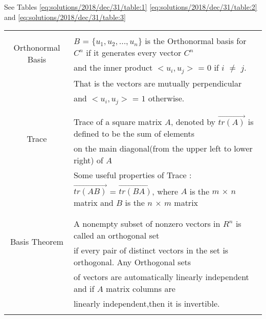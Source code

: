 See Tables     \ref{eq:solutions/2018/dec/31/table:1}
    \ref{eq:solutions/2018/dec/31/table:2} and 
    \ref{eq:solutions/2018/dec/31/table:3}

\begin{table*}[ht!]
\centering
\begin{tabular}{|c|l|}
    \hline
	\multirow{3}{*}{Orthonormal Basis} 
	& \\
	& $B$ = $\{u_1,u_2,...,u_n\}$ is the Orthonormal basis for $C^n$ if it generates every vector $C^n$\\
	& and the inner product $<u_i,u_j>$ = $0$ if $i$ $\ne$ $j$.\\
	& That is the vectors are mutually perpendicular\\
	& and $<u_i,u_j>$ = $1$ otherwise. \\
	&\\
	\hline
	\multirow{3}{*}{Trace} 
	&\\
	& Trace of a square matrix $A$, denoted by $\Vec{tr(A)}$ is defined to be the sum of elements\\
	& on the main diagonal(from the upper left to lower right) of $A$\\
	& Some useful properties of Trace : \\
	&  $\Vec{tr(AB)}$ =  $\Vec{tr(BA)}$, where $A$ is the $m$ $\times$ $n$ matrix and $B$ is the $n$ $\times$ $m$ matrix\\  
	&\\
	\hline
	\multirow{3}{*}{Basis Theorem} 
	&\\
	& A nonempty subset of nonzero vectors in $R^n$ is called an orthogonal set\\
	& if every pair of distinct vectors in the set is orthogonal. Any Orthogonal sets\\
	&  of vectors are automatically linearly independent and if $A$ matrix columns are\\
	& linearly independent,then it is invertible.\\
	&\\
    \hline
\end{tabular}
    \caption{Definitions}
\label{eq:solutions/2018/dec/31/table:1}
\end{table*}
\onecolumn
